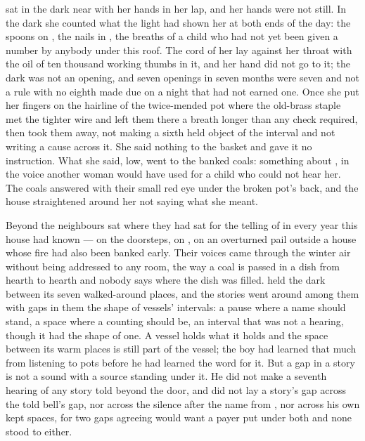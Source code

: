  sat in the dark near  with her hands in her lap, and her hands were not still. In the dark she counted what the light had shown her at both ends of the day: the spoons on , the nails in , the breaths of a child who had not yet been given a number by anybody under this roof. The cord of her  lay against her throat with the oil of ten thousand working thumbs in it, and her hand did not go to it; the dark was not an opening, and seven openings in seven months were seven and not a rule with no eighth made due on a night that had not earned one. Once she put her fingers on the hairline of the twice-mended pot where the old-brass staple met the tighter wire and left them there a breath longer than any check required, then took them away, not making a sixth held object of the interval and not writing a cause across it. She said nothing to the basket and gave it no instruction. What she said, low, went to the banked coals: something about , in the voice another woman would have used for a child who could not hear her. The coals answered with their small red eye under the broken pot's back, and the house straightened around her not saying what she meant.

Beyond  the neighbours sat where they had sat for the telling of  in every year this house had known --- on the doorsteps, on , on an overturned pail outside a house whose fire had also been banked early. Their voices came through the winter air without being addressed to any room, the way a coal is passed in a dish from hearth to hearth and nobody says where the dish was filled.  held the dark between its seven walked-around places, and the stories went around among them with gaps in them the shape of vessels' intervals: a pause where a name should stand, a space where a counting should be, an interval that was not a hearing, though it had the shape of one. A vessel holds what it holds and the space between its warm places is still part of the vessel; the boy had learned that much from listening to pots before he had learned the word for it. But a gap in a story is not a sound with a source standing under it. He did not make a seventh hearing of any story told beyond the door, and did not lay a story's gap across the told bell's gap, nor across the silence after the name from , nor across his own kept spaces, for two gaps agreeing would want a payer put under both and none stood to either.

